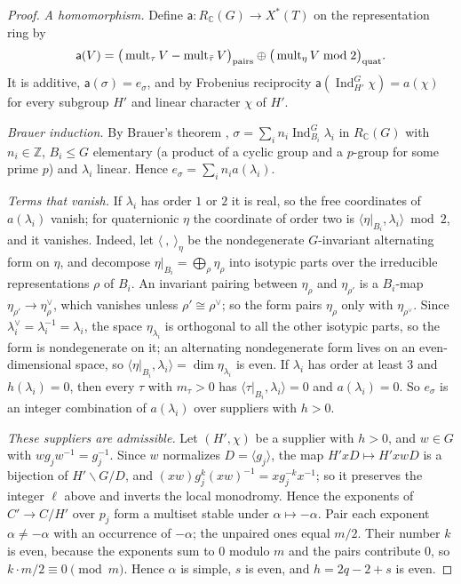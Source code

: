 \documentclass[11pt]{amsart}
\theoremstyle{definition}
\theoremstyle{remark}
\newcommand{\Z}{\mathbb Z}
\newcommand{\C}{\mathbb C}
\newcommand{\Ind}{\operatorname{Ind}}
\begin{document}
\begin{proof}
\emph{A homomorphism.} Define $\mathsf a\colon R_\C(G)\to X^*(T)$ on the representation ring by
\[
\mathsf a(V)=\big(\operatorname{mult}_\tau V-\operatorname{mult}_{\bar\tau}V\big)_{\rm pairs}\oplus\big(\operatorname{mult}_\eta V\bmod2\big)_{\rm quat}.
\]
It is additive, $\mathsf a(\sigma)=e_\sigma$, and by Frobenius reciprocity $\mathsf a(\Ind_{H'}^G\chi)=a(\chi)$ for every subgroup $H'$ and linear character $\chi$ of $H'$.

\emph{Brauer induction.} By Brauer's theorem \cite[\S10.5, Theorem~20]{SerreLin}, $\sigma=\sum_in_i\Ind_{B_i}^G\lambda_i$ in $R_\C(G)$ with $n_i\in\Z$, $B_i\le G$ elementary (a product of a cyclic group and a $p$-group for some prime $p$) and $\lambda_i$ linear. Hence $e_\sigma=\sum_in_ia(\lambda_i)$.

\emph{Terms that vanish.} If $\lambda_i$ has order $1$ or $2$ it is real, so the free coordinates of $a(\lambda_i)$ vanish; for quaternionic $\eta$ the coordinate of order two is $\langle\eta|_{B_i},\lambda_i\rangle\bmod2$, and it vanishes. Indeed, let $\langle\ ,\ \rangle_\eta$ be the nondegenerate $G$-invariant alternating form on $\eta$, and decompose $\eta|_{B_i}=\bigoplus_\rho\eta_\rho$ into isotypic parts over the irreducible representations $\rho$ of $B_i$. An invariant pairing between $\eta_\rho$ and $\eta_{\rho'}$ is a $B_i$-map $\eta_{\rho'}\to\eta_\rho^\vee$, which vanishes unless $\rho'\cong\rho^\vee$; so the form pairs $\eta_\rho$ only with $\eta_{\rho^\vee}$. Since $\lambda_i^\vee=\lambda_i^{-1}=\lambda_i$, the space $\eta_{\lambda_i}$ is orthogonal to all the other isotypic parts, so the form is nondegenerate on it; an alternating nondegenerate form lives on an even-dimensional space, so $\langle\eta|_{B_i},\lambda_i\rangle=\dim\eta_{\lambda_i}$ is even. If $\lambda_i$ has order at least $3$ and $h(\lambda_i)=0$, then every $\tau$ with $m_\tau>0$ has $\langle\tau|_{B_i},\lambda_i\rangle=0$ and $a(\lambda_i)=0$. So $e_\sigma$ is an integer combination of $a(\lambda_i)$ over suppliers with $h>0$.

\emph{These suppliers are admissible.} Let $(H',\chi)$ be a supplier with $h>0$, and $w\in G$ with $wg_jw^{-1}=g_j^{-1}$. Since $w$ normalizes $D=\langle g_j\rangle$, the map $H'xD\mapsto H'xwD$ is a bijection of $H'\backslash G/D$, and $(xw)g_j^k(xw)^{-1}=xg_j^{-k}x^{-1}$; so it preserves the integer $\ell$ above and inverts the local monodromy. Hence the exponents of $C'\to C/H'$ over $p_j$ form a multiset stable under $\alpha\mapsto-\alpha$. Pair each exponent $\alpha\ne-\alpha$ with an occurrence of $-\alpha$; the unpaired ones equal $m/2$. Their number $k$ is even, because the exponents sum to $0$ modulo $m$ and the pairs contribute $0$, so $k\cdot m/2\equiv0\pmod m$. Hence $\alpha$ is simple, $s$ is even, and $h=2q-2+s$ is even.
\end{proof}
\end{document}
